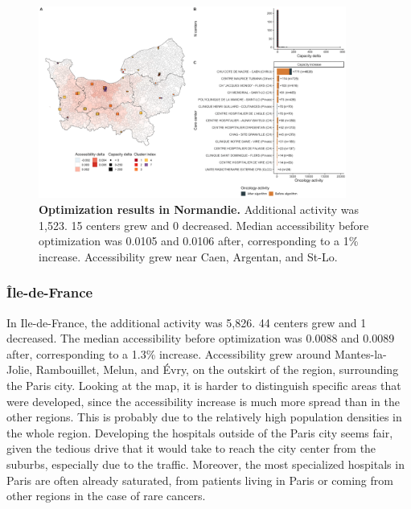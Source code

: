 \begin{figure}[h!]
    \includegraphics[width=0.9\textwidth]{images/camion/optim_region/optim_Normandie.png}
    \centering
    \caption{ \textbf{Optimization results in Normandie.} Additional activity
        was 1,523. 15 centers grew and 0 decreased. Median accessibility before
        optimization was 0.0105 and 0.0106 after, corresponding to a 1\%
        increase. Accessibility grew near Caen, Argentan, and St-Lo. }
\end{figure}

\subsubsection{Île-de-France}

In Ile-de-France, the additional activity was 5,826. 44 centers grew and 1
decreased. The median accessibility before optimization was 0.0088 and
0.0089 after, corresponding to a 1.3\% increase. Accessibility grew
around Mantes-la-Jolie, Rambouillet, Melun, and Évry, on the outskirt of the
region, surrounding the Paris city. Looking at the map, it is harder to
distinguish specific areas that were developed, since the accessibility
increase is much more spread than in the other regions. This is probably
due to the relatively high population densities in the whole region. Developing
the hospitals outside of the Paris city seems fair, given the tedious drive
that it would take to reach the city center from the suburbs, especially due to
the traffic. Moreover, the most specialized hospitals in Paris are often
already saturated, from patients living in Paris or coming from other regions
in the case of rare cancers.

